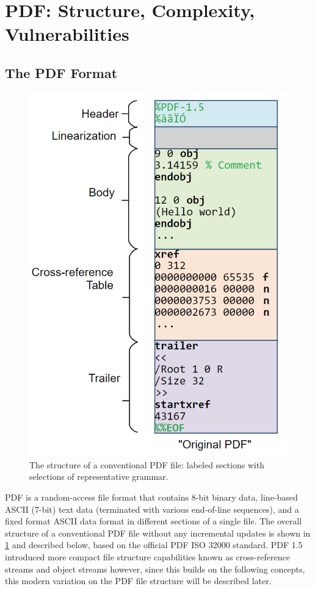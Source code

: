 \section{PDF: Structure, Complexity, Vulnerabilities}
\label{sec:pdf}

\subsection{The PDF Format}
\label{sec:pdfstructure}

\begin{figure}[t]
    \centering
    \includegraphics[width=0.65\linewidth]{figures/pdf-structure.png}
    \caption{The structure of a conventional PDF file: labeled sections with selections of representative grammar.}
    \label{fig:pdf-structure}
\end{figure}

PDF is a random-access file format that contains 8-bit binary data, line-based ASCII (7-bit)
text data (terminated with various end-of-line sequences), and a fixed format ASCII 
data format in different sections of a single file. The overall structure of a 
conventional PDF file without any incremental updates is shown in \cref{fig:pdf-structure} and 
described below, based on the official PDF ISO 32000 standard.
PDF 1.5 introduced more compact file structure capabilities known as cross-reference streams 
and object streams however, since this builds on the following concepts, this modern 
variation on the PDF file structure will be described later.


